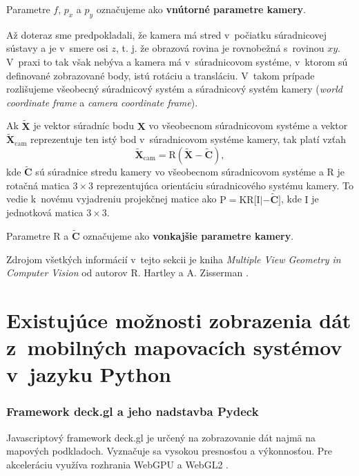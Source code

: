 Parametre $f$, $p_x$ a $p_y$ označujeme ako \textbf{vnútorné parametre kamery}.

Až doteraz sme predpokladali, že kamera má stred v~počiatku súradnicovej sústavy a je  v~smere osi $z$, t. j. že obrazová rovina je rovnobežná s~rovinou $xy$. V~praxi to tak však nebýva a kamera má v~súradnicovom systéme, v~ktorom sú definované zobrazované body, istú rotáciu a transláciu. V~takom prípade rozlišujeme všeobecný súradnicový systém a súradnicový systém kamery (\emph{world coordinate frame} a \emph{camera coordinate frame}).

Ak $\widetilde{\mathbf{X}}$ je vektor súradníc bodu $\mathbf{X}$ vo všeobecnom súradnicovom systéme a vektor $\widetilde{\mathbf{X}}_{\mathrm{cam}}$ reprezentuje ten istý bod v~súradnicovom systéme kamery, tak platí vzťah 
$$\widetilde{\mathbf{X}}_{\mathrm{cam}} = \mathrm{R} (\widetilde{\mathbf{X}} - \widetilde{\mathbf{C}}),$$ 
kde $\widetilde{\mathbf{C}}$ sú súradnice stredu kamery vo všeobecnom súradnicovom systéme a $\mathrm{R}$ je rotačná matica $3 \times 3$ reprezentujúca orientáciu súradnicového systému kamery. To vedie k~novému vyjadreniu projekčnej matice ako $\mathrm{P} = \mathrm{K} \mathrm{R} \bigl[ \mathrm{I} | - \widetilde{\mathbf{C}} \bigr]$, kde $\mathrm{I}$ je jednotková matica $3 \times 3$.

Parametre $\mathrm{R}$ a $\widetilde{\mathbf{C}}$ označujeme ako \textbf{vonkajšie parametre kamery}.

Zdrojom všetkých informácií v~tejto sekcii je kniha \emph{Multiple View Geometry in Computer Vision} od autorov R. Hartley a A. Zisserman \cite{multiple_view_geometry}.

\section{Existujúce možnosti zobrazenia dát z~mobilných mapovacích systémov v~jazyku Python}

\subsubsection{Framework deck.gl a jeho nadstavba Pydeck}
\label{sec:deck_gl}

Javascriptový framework deck.gl je určený na zobrazovanie dát najmä na mapových podkladoch. Vyznačuje sa vysokou presnosťou a výkonnosťou. Pre akceleráciu využíva rozhrania WebGPU a WebGL2 \cite{deck.gl_documentation}.

